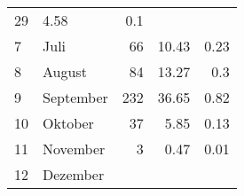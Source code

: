 \begin{longtable}{lXrrr}
       \num{29} &
       \num[round-mode=places,round-precision=2]{4,58} &
         \num[round-mode=places,round-precision=2]{0,1} \\

     7 &
     \multicolumn{1}{X}{ Juli   } &


       \num{66} &
       \num[round-mode=places,round-precision=2]{10,43} &
         \num[round-mode=places,round-precision=2]{0,23} \\

     8 &
     \multicolumn{1}{X}{ August   } &


       \num{84} &
       \num[round-mode=places,round-precision=2]{13,27} &
         \num[round-mode=places,round-precision=2]{0,3} \\

     9 &
     \multicolumn{1}{X}{ September   } &


       \num{232} &
       \num[round-mode=places,round-precision=2]{36,65} &
         \num[round-mode=places,round-precision=2]{0,82} \\

     10 &
     \multicolumn{1}{X}{ Oktober   } &


       \num{37} &
       \num[round-mode=places,round-precision=2]{5,85} &
         \num[round-mode=places,round-precision=2]{0,13} \\

     11 &
     \multicolumn{1}{X}{ November   } &


       \num{3} &
       \num[round-mode=places,round-precision=2]{0,47} &
         \num[round-mode=places,round-precision=2]{0,01} \\

     12 &
     \multicolumn{1}{X}{ Dezember   } &



\end{longtable}
